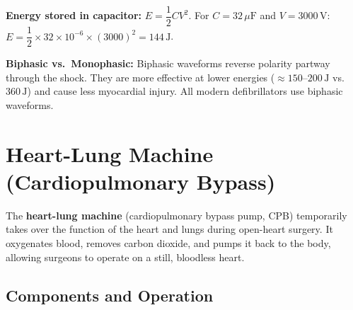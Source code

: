 \documentclass[12pt,a4paper]{article}
\begin{document}
\begin{tcolorbox}[tikzbox, title={Defibrillator Discharge Circuit and Waveforms}]
\end{tcolorbox}

\textbf{Energy stored in capacitor:} $E = \dfrac{1}{2}CV^2$. For $C = 32\,\mu\text{F}$ and $V = 3000\,\text{V}$: $E = \dfrac{1}{2}\times 32\times10^{-6}\times(3000)^2 = 144\,\text{J}$.

\textbf{Biphasic vs.\ Monophasic:} Biphasic waveforms reverse polarity partway through the shock. They are more effective at lower energies ($\approx 150$--$200\,\text{J}$ vs.\ $360\,\text{J}$) and cause less myocardial injury. All modern defibrillators use biphasic waveforms.

\section{Heart-Lung Machine (Cardiopulmonary Bypass)}

\begin{tcolorbox}[defbox, title={\textbf{Heart-Lung Machine}}]
The \textbf{heart-lung machine} (cardiopulmonary bypass pump, CPB) temporarily takes over the function of the heart and lungs during open-heart surgery. It oxygenates blood, removes carbon dioxide, and pumps it back to the body, allowing surgeons to operate on a still, bloodless heart.
\end{tcolorbox}

\subsection{Components and Operation}
\end{document}
